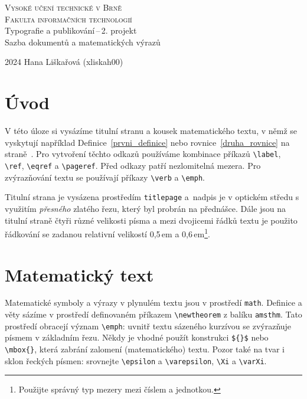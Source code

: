 \documentclass[a4paper, twocolumn, 11pt]{article}
\begin{document}
\begin{titlepage}
    \begin{center}
            \Huge{\textsc{Vysoké učení technické v Brně}}\\[0.5em]
            \huge{\textsc{Fakulta informačních technologií}}\\
        
        \LARGE{Typografie a publikování\,--\,2. projekt\\[0.6em]
        Sazba dokumentů a matematických výrazů\\}
    \end{center}
    {\Large{2024 \hfill Hana Liškařová (xliskah00)}}
\end{titlepage}



\section*{Úvod}
\label{prvni_strana}
    V této úloze si vysázíme titulní stranu a kousek matematického textu, v němž se vyskytují například Definice~\ref{prvni_definice} nebo rovnice~\eqref{druha_rovnice} na straně~\pageref{prvni_strana}. Pro vytvoření
    těchto odkazů používáme kombinace příkazů \verb|\label|,
    \verb|\ref|, \verb|\eqref| a \verb|\pageref|. Před odkazy patří nezlomitelná mezera. Pro zvýrazňování textu se používají příkazy \verb|\verb| a \verb|\emph|.
\par 
    Titulní strana je vysázena prostředím \verb|titlepage| a~nadpis je v optickém středu s využitím \emph{přesného} zlatého řezu, který byl probrán na přednášce. Dále jsou
    na titulní straně čtyři různé velikosti písma a mezi
    dvojicemi řádků textu je použito řádkování se zadanou relativní velikostí 0,5\,em a 0,6\,em\footnote{Použijte správný typ mezery mezi číslem a jednotkou.}.

\section{Matematický text}
    Matematické symboly a výrazy v plynulém textu jsou
    v prostředí \verb|math|. Definice a věty sázíme v prostředí
    definovaném příkazem \verb|\newtheorem| z balíku \verb|amsthm|.
    Tato prostředí obracejí význam \verb|\emph|: uvnitř textu
    sázeného kurzívou se zvýrazňuje písmem v základním řezu. Někdy je vhodné použít konstrukci \verb|${}$|
    nebo \verb|\mbox{}|, která zabrání zalomení (matematického) textu. Pozor také na tvar i sklon řeckých písmen:
    srovnejte \verb|\epsilon| a \verb|\varepsilon|, \verb|\Xi| a \verb|\varXi|.
\end{document}
